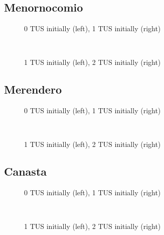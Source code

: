 \documentclass[12pt]{article}
\begin{document}
\subsection{Menornocomio}
\begin{figure}[H]%
	\centering
	\caption*{0 TUS initially (left), 1 TUS initially (right)}
	 \quad 
	 \\
	
	\caption*{1 TUS initially (left), 2 TUS initially (right)}
	 \qquad
	\label{fig:menornocomioTwo}%
\end{figure}

\subsection{Merendero}
\begin{figure}[H]%
	\centering
	\caption*{0 TUS initially (left), 1 TUS initially (right)}
	 \quad 
	 \\
	
	\caption*{1 TUS initially (left), 2 TUS initially (right)}
	 \qquad
	\label{fig:merenderoTwo}%
\end{figure}

\subsection{Canasta}
\begin{figure}[H]%
	\centering
	\caption*{0 TUS initially (left), 1 TUS initially (right)}
	 \quad 
	 \\
	
	\caption*{1 TUS initially (left), 2 TUS initially (right)}
	 \qquad
	\label{fig:canastaTwo}%
\end{figure}
\end{document}
